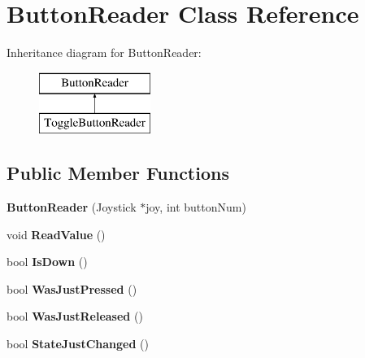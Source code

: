 \hypertarget{class_button_reader}{}\section{Button\+Reader Class Reference}
\label{class_button_reader}
Inheritance diagram for Button\+Reader\+:\begin{figure}[H]
\begin{center}
\leavevmode
\includegraphics[height=2.000000cm]{class_button_reader}
\end{center}
\end{figure}
\subsection*{Public Member Functions}
\begin{DoxyCompactItemize}
\item 
\mbox{\label{class_button_reader_a1bb75f75d6e392a748c6101e09e3bd3c}} 
{\bfseries Button\+Reader} (Joystick $\ast$joy, int button\+Num)
\item 
\mbox{\label{class_button_reader_a4585d7ca717ea49021ac5a786c352b81}} 
void {\bfseries Read\+Value} ()
\item 
\mbox{\label{class_button_reader_a89a81fffd0726973811c6e791ac12a1d}} 
bool {\bfseries Is\+Down} ()
\item 
\mbox{\label{class_button_reader_ace4a07bf7f65418c026477b9d5ab1225}} 
bool {\bfseries Was\+Just\+Pressed} ()
\item 
\mbox{\label{class_button_reader_afded4de61711a165928fe0730d8743e7}} 
bool {\bfseries Was\+Just\+Released} ()
\item 
\mbox{\label{class_button_reader_a2c19cae72a053bbba95f1c1a91735876}} 
bool {\bfseries State\+Just\+Changed} ()
\end{DoxyCompactItemize}
